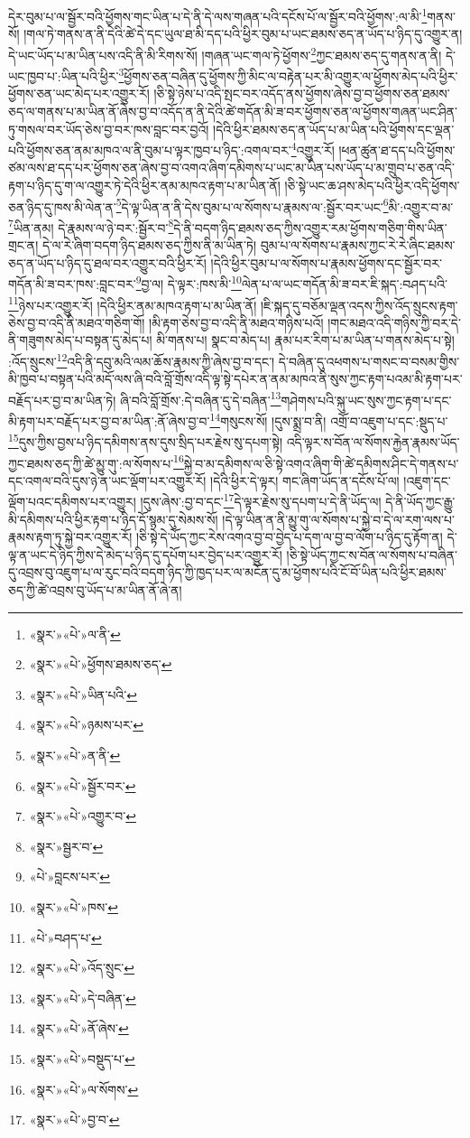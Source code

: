 དེར་བུམ་པ་ལ་སྦྱོར་བའི་ཕྱོགས་གང་ཡིན་པ་དེ་ནི་དེ་ལས་གཞན་པའི་དངོས་པོ་ལ་སྦྱོར་བའི་ཕྱོགས་:ལ་མི་\footnote{«སྣར་»«པེ་»ལ་ནི་}གནས་སོ། །གལ་ཏེ་གནས་ན་ནི་དེའི་ཚེ་དེ་དང་ཡུལ་ཐ་མི་དད་པའི་ཕྱིར་བུམ་པ་ཡང་ཐམས་ཅད་ན་ཡོད་པ་ཉིད་དུ་འགྱུར་ན། དེ་ཡང་ཡོད་པ་མ་ཡིན་པས་འདི་ནི་མི་རིགས་སོ། །གཞན་ཡང་གལ་ཏེ་ཕྱོགས་\footnote{«སྣར་»«པེ་»ཕྱོགས་ཐམས་ཅད་}ཀྱང་ཐམས་ཅད་དུ་གནས་ན་ནི། དེ་ཡང་ཁྱབ་པ་:ཡིན་པའི་ཕྱིར་\footnote{«སྣར་»«པེ་»ཡིན་པའི་}ཕྱོགས་ཅན་བཞིན་དུ་ཕྱོགས་ཀྱི་མིང་ལ་བརྟེན་པར་མི་འགྱུར་ལ་ཕྱོགས་མེད་པའི་ཕྱིར་ཕྱོགས་ཅན་ཡང་མེད་པར་འགྱུར་རོ། །ཅི་སྟེ་ཉེས་པ་འདི་སྤང་བར་འདོད་ནས་ཕྱོགས་ཞེས་བྱ་བ་ཕྱོགས་ཅན་ཐམས་ཅད་ལ་གནས་པ་མ་ཡིན་ནོ་ཞེས་བྱ་བ་འདོད་ན་ནི་དེའི་ཚེ་གདོན་མི་ཟ་བར་ཕྱོགས་ཅན་ལ་ཕྱོགས་གཞན་ཡང་ཤིན་ཏུ་གསལ་བར་ཡོད་ཅེས་བྱ་བར་ཁས་བླང་བར་བྱའོ། །དེའི་ཕྱིར་ཐམས་ཅད་ན་ཡོད་པ་མ་ཡིན་པའི་ཕྱོགས་དང་ལྡན་པའི་ཕྱོགས་ཅན་ནམ་མཁའ་ལ་ནི་བུམ་པ་ལྟར་ཁྱབ་པ་ཉིད་:འགལ་བར་\footnote{«སྣར་»«པེ་»ཉམས་པར་}འགྱུར་རོ། །ཕན་ཚུན་ཐ་དད་པའི་ཕྱོགས་ཙམ་ལས་ཐ་དད་པར་ཕྱོགས་ཅན་ཞེས་བྱ་བ་འགའ་ཞིག་དམིགས་པ་ཡང་མ་ཡིན་པས་ཡོད་པ་མ་གྲུབ་པ་ཅན་འདི་རྟག་པ་ཉིད་དུ་ག་ལ་འགྱུར་ཏེ་དེའི་ཕྱིར་ནམ་མཁའ་རྟག་པ་མ་ཡིན་ནོ། །ཅི་སྟེ་ཡང་ཆ་ཤས་མེད་པའི་ཕྱིར་འདི་ཕྱོགས་ཅན་ཉིད་དུ་ཁས་མི་ལེན་ན་\footnote{«སྣར་»«པེ་»ན་ནི་}དེ་ལྟ་ཡིན་ན་ནི་དེས་བུམ་པ་ལ་སོགས་པ་རྣམས་ལ་:སྦྱོར་བར་ཡང་\footnote{«སྣར་»«པེ་»སྦྱོར་བར་}མི་:འགྱུར་བ་མ་\footnote{«སྣར་»«པེ་»འགྱུར་བ་}ཡིན་ནམ། དེ་རྣམས་ལ་ཉེ་བར་:སྦྱོར་བ་\footnote{«སྣར་»སྦྱར་བ་}དེ་ནི་བདག་ཉིད་ཐམས་ཅད་ཀྱིས་འགྱུར་རམ་ཕྱོགས་གཅིག་གིས་ཡིན་གྲང་ན། དེ་ལ་རེ་ཞིག་བདག་ཉིད་ཐམས་ཅད་ཀྱིས་ནི་མ་ཡིན་ཏེ། བུམ་པ་ལ་སོགས་པ་རྣམས་ཀྱང་རེ་རེ་ཞིང་ཐམས་ཅད་ན་ཡོད་པ་ཉིད་དུ་ཐལ་བར་འགྱུར་བའི་ཕྱིར་རོ། །དེའི་ཕྱིར་བུམ་པ་ལ་སོགས་པ་རྣམས་ཕྱོགས་དང་སྦྱོར་བར་གདོན་མི་ཟ་བར་ཁས་:བླང་བར་\footnote{«པེ་»བླངས་པར་}བྱ་ལ། དེ་ལྟར་:ཁས་མི་\footnote{«སྣར་»«པེ་»ཁས་}ལེན་པ་ལ་ཡང་གདོན་མི་ཟ་བར་ཇི་སྐད་:བཤད་པའི་\footnote{«པེ་»བཤད་པ་}ཉེས་པར་འགྱུར་རོ། །དེའི་ཕྱིར་ནམ་མཁའ་རྟག་པ་མ་ཡིན་ནོ། །ཇི་སྐད་དུ་བཅོམ་ལྡན་འདས་ཀྱིས་འོད་སྲུངས་རྟག་ཅེས་བྱ་བ་འདི་ནི་མཐའ་གཅིག་གོ། །མི་རྟག་ཅེས་བྱ་བ་འདི་ནི་མཐའ་གཉིས་པའོ། །གང་མཐའ་འདི་གཉིས་ཀྱི་བར་དེ་ནི་གཟུགས་མེད་པ་བསྟན་དུ་མེད་པ། མི་གནས་པ། སྣང་བ་མེད་པ། རྣམ་པར་རིག་པ་མ་ཡིན་པ་གནས་མེད་པ་སྟེ། :འོད་སྲུངས་\footnote{«སྣར་»«པེ་»འོད་སྲུང་}འདི་ནི་དབུ་མའི་ལམ་ཆོས་རྣམས་ཀྱི་ཞེས་བྱ་བ་དང་། དེ་བཞིན་དུ་འཕགས་པ་གསང་བ་བསམ་གྱིས་མི་ཁྱབ་པ་བསྟན་པའི་མདོ་ལས་ཞི་བའི་བློ་གྲོས་འདི་ལྟ་སྟེ་དཔེར་ན་ནམ་མཁའ་ནི་སུས་ཀྱང་རྟག་པའམ་མི་རྟག་པར་བརྗོད་པར་བྱ་བ་མ་ཡིན་ཏེ། ཞི་བའི་བློ་གྲོས་:དེ་བཞིན་དུ་དེ་བཞིན་\footnote{«སྣར་»«པེ་»དེ་བཞིན་}གཤེགས་པའི་སྐུ་ཡང་སུས་ཀྱང་རྟག་པ་དང་མི་རྟག་པར་བརྗོད་པར་བྱ་བ་མ་ཡིན་:ནོ་ཞེས་བྱ་བ་\footnote{«སྣར་»«པེ་»ནོ་ཞེས་}གསུངས་སོ། །དུས་སྨྲ་བ་ནི། འགྲོ་བ་འཇུག་པ་དང་:སྡུད་པ་\footnote{«སྣར་»«པེ་»བསྡུད་པ་}དུས་ཀྱིས་བྱས་པ་ཉིད་དམིགས་ནས་དུས་སྲིད་པར་རྗེས་སུ་དཔག་སྟེ། འདི་ལྟར་ས་བོན་ལ་སོགས་རྐྱེན་རྣམས་ཡོད་ཀྱང་ཐམས་ཅད་ཀྱི་ཚེ་མྱུ་གུ་:ལ་སོགས་པ་\footnote{«སྣར་»«པེ་»ལ་སོགས་}སྐྱེ་བ་མ་དམིགས་ལ་ཅི་སྟེ་འགའ་ཞིག་གི་ཚེ་དམིགས་ཤིང་དེ་གནས་པ་དང་འགལ་བའི་དུས་ཉེ་ན་ཡང་ལྡོག་པར་འགྱུར་རོ། །དེའི་ཕྱིར་དེ་ལྟར། གང་ཞིག་ཡོད་ན་དངོས་པོ་ལ། །འཇུག་དང་ལྡོག་པའང་དམིགས་པར་འགྱུར། །དུས་ཞེས་:བྱ་བ་དང་\footnote{«སྣར་»«པེ་»བྱ་བ་}དེ་ལྟར་རྗེས་སུ་དཔག་པ་དེ་ནི་ཡོད་ལ། དེ་ནི་ཡོད་ཀྱང་རྒྱུ་མི་དམིགས་པའི་ཕྱིར་རྟག་པ་ཉིད་དོ་སྙམ་དུ་སེམས་སོ། །དེ་ལྟ་ཡིན་ན་ནི་མྱུ་གུ་ལ་སོགས་པ་སྐྱེ་བ་དེ་ལ་རག་ལས་པ་རྣམས་རྟག་ཏུ་སྐྱེ་བར་འགྱུར་རོ། །ཅི་སྟེ་དེ་ཡོད་ཀྱང་རེས་འགའ་བྱ་བ་བྱེད་པ་དག་ལ་བྱ་བ་ལོག་པ་ཉིད་དུ་རྟོག་ན། དེ་ལྟ་ན་ཡང་དེ་ཉིད་ཀྱིས་དེ་མེད་པ་ཉིད་དུ་དཔོག་པར་བྱེད་པར་འགྱུར་རོ། །ཅི་སྟེ་ཡོད་ཀྱང་ས་བོན་ལ་སོགས་པ་བཞིན་དུ་འབྲས་བུ་འཇུག་པ་ལ་རུང་བའི་བདག་ཉིད་ཀྱི་ཁྱད་པར་ལ་མངོན་དུ་མ་ཕྱོགས་པའི་ངོ་བོ་ཡིན་པའི་ཕྱིར་ཐམས་ཅད་ཀྱི་ཚེ་འབྲས་བུ་ཡོད་པ་མ་ཡིན་ནོ་ཞེ་ན། 